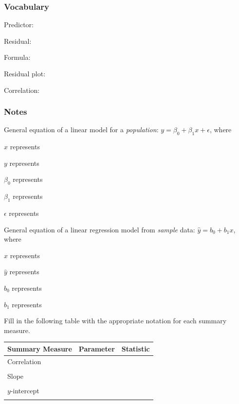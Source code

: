 \documentclass[
]{report}
\newcommand{\rgs}{\vspace{12pt}} %
\newcommand{\rgi}{\hspace{24pt}}  %
\begin{document}

\hypertarget{vocabulary-5}{%
\subsubsection*{Vocabulary}\label{vocabulary-5}}

Predictor:
\rgs

Residual:
\rgs

\rgi Formula:
\rgs

Residual plot:
\rgs

Correlation:
\rgs

\hypertarget{notes-7}{%
\subsubsection*{Notes}\label{notes-7}}

General equation of a linear model for a \emph{population}: \(y= \beta_0+ \beta_1 x+\epsilon\), where

\rgi \(x\) represents
\rgs

\rgi \(y\) represents
\rgs

\rgi \(\beta_0\) represents
\rgs

\rgi \(\beta_1\) represents
\rgs

\rgi \(\epsilon\) represents
\rgs

General equation of a linear regression model from \emph{sample} data: \(\hat{y}= b_0+ b_1 x\), where

\rgi \(x\) represents
\rgs

\rgi \(\hat{y}\) represents
\rgs

\rgi \(b_0\) represents
\rgs

\rgi \(b_1\) represents
\rgs

Fill in the following table with the appropriate notation for each summary measure.

\begin{center}
\begin{tabular}{|l|p{2in}|p{2in}|} \hline
Summary Measure & Parameter & Statistic \\ \hline
Correlation & & \\ 
& & \\ \hline
Slope & & \\ 
& & \\ \hline
$y$-intercept & & \\ 
& & \\ \hline
\end{tabular}
\end{center}
\end{document}
